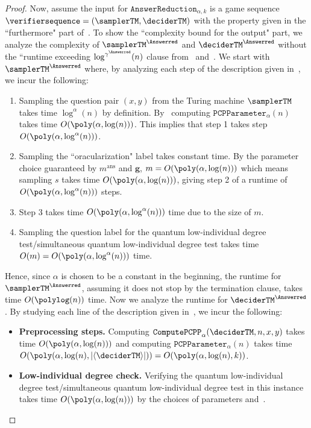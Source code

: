 \begin{proof}
Now, assume the input for $\texttt{AnswerReduction}_{\alpha, k}$ is a game sequence $\verifiersequence = (\samplerTM, \deciderTM)$ with the property given in the ``furthermore" part of~. To show the ``complexity bound for the output" part, we analyze the complexity of $\samplerTM^{\Answerred}$ and $\deciderTM^{\Answerred}$ without the ``runtime exceeding $\log^{\gamma^{\Answerred}}(n)$ clause from~ and~. We start with $\samplerTM^{\Answerred}$ where, by analyzing each step of the description given in~, we incur the following:
\begin{enumerate}
	\item Sampling the question pair $(x,y)$ from the Turing machine $\samplerTM$ takes time $\log^{\alpha}(n)$ by definition. By~ computing $\mathtt{PCPParameter}_{\alpha}(n)$ takes time $O(\poly(\alpha, \log(n)))$. This implies that step 1 takes step $O(\poly(\alpha, \log^{\alpha}(n)))$. 
	\item Sampling the ``oracularization" label takes constant time. By the parameter choice guaranteed by $m^{\text{ans}}$ and $\textbf{g}$, $m = O(\poly(\alpha, \log(n)))$ which means sampling $s$ takes time $O(\poly(\alpha, \log(n)))$, giving step 2 of a runtime of $O(\poly(\alpha, \log^{\alpha}(n)))$ steps. 
	\item Step 3 takes time $O(\poly(\alpha, \log^{\alpha}(n)))$ time due to the size of $m$.
	\item Sampling the question label for the quantum low-individual degree test/simultaneous quantum low-individual degree test takes time $O(m) = O(\poly(\alpha, \log^{\alpha}(n)))$ time. 
\end{enumerate}
Hence, since $\alpha$ is chosen to be a constant in the beginning, the runtime for $\samplerTM^{\Answerred}$, assuming it does not stop by the termination clause, takes time $O(\polylog(n))$ time. Now we analyze the runtime for $\deciderTM^{\Answerred}$. By studying each line of the description given in~, we incur the following:
\begin{itemize}
	\item\textbf{Preprocessing steps. } Computing $\mathtt{ComputePCPP}_{\alpha}(\deciderTM, n,x,y)$ takes time $O(\poly(\alpha, \log(n)))$ and computing $\mathtt{PCPParameter}_{\alpha}(n)$ takes time $O(\poly(\alpha, \log(n), |\langle \deciderTM \rangle |)) = O(\poly(\alpha, \log(n), k))$. 
	\item \textbf{Low-individual degree check. } Verifying the quantum low-individual degree test/simultaneous quantum low-individual degree test in this instance takes time $O(\poly(\alpha, \log(n)))$ by the choices of parameters and~. 

\end{itemize}
\end{proof}
